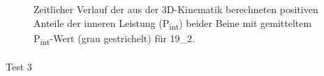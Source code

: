 \documentclass[
  letterpaper,
  DIV=11]{scrartcl}
\makeatletter
\let\oldparagraph\paragraph
\renewcommand{\paragraph}{
    \@ifstar
      \xxxParagraphStar
      \xxxParagraphNoStar
  }
\newcommand{\xxxParagraphStar}[1]{\oldparagraph*{#1}\mbox{}}
\newcommand{\xxxParagraphNoStar}[1]{\oldparagraph{#1}\mbox{}}
\makeatother
\begin{document}
\begin{figure}


\caption{\label{fig-PInt_Kinematik_19_2}Zeitlicher Verlauf der aus der
3D-Kinematik berechneten positiven Anteile der inneren Leistung
(P\textsubscript{int}) beider Beine mit gemitteltem
P\textsubscript{int}-Wert (grau gestrichelt) für 19\_2.}

\end{figure}%

\paragraph{Test 3}
\end{document}
